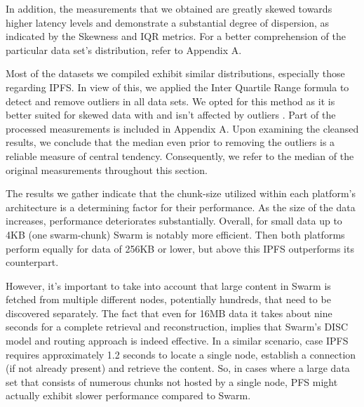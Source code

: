 In addition, the measurements that we obtained are greatly skewed towards higher latency levels and demonstrate a substantial degree of dispersion, as indicated by the Skewness and IQR metrics. For a better comprehension of the particular data set's distribution, refer to Appendix A.

Most of the datasets we compiled  exhibit similar distributions, especially those regarding IPFS. In view of this, we applied the Inter Quartile Range formula to detect and remove outliers in all data sets. We opted for this method as it is better suited for skewed data with and isn't affected by outliers \citep{whaley_2005}. Part of the processed measurements is included in Appendix A. Upon examining the cleansed results, we conclude that the median even prior to removing the outliers is a reliable measure of central tendency.  Consequently, we refer to the median of the original measurements throughout this section.

The results we gather indicate that the chunk-size utilized within each platform’s architecture is a determining factor for their performance. As the size of the data increases, performance deteriorates substantially. Overall, for small data up to 4KB (one swarm-chunk) Swarm is notably more efficient. Then both platforms perform equally for data of 256KB or lower, but above this IPFS outperforms its counterpart.

However, it's important to take into account that large content in Swarm is fetched from multiple different nodes, potentially hundreds, that need to be discovered separately. The fact that even for 16MB data it takes about nine seconds for a complete retrieval and reconstruction, implies that Swarm's DISC model and routing approach is indeed effective. In a similar scenario, case IPFS requires approximately 1.2 seconds to locate a single node, establish a connection (if not already present) and retrieve the content. So, in cases where a large data set that consists of numerous chunks not hosted by a single node, PFS might actually exhibit slower performance compared to Swarm. 


